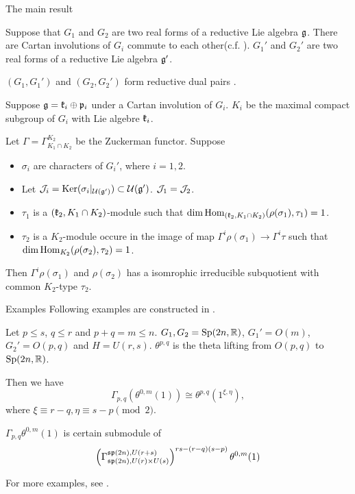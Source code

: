 \documentclass{beamer}
\begin{document}
\begin{frame}{The main result}
\begin{theorem}
  Suppose that 
  $G_1$ and $G_2$ are two real forms of a reductive Lie algebra $\fgg$.
  There are Cartan involutions of $G_i$ commute to each other(c.f. \cite{WallachZhu2004}).
  $G_1'$ and $G_2'$ are two real forms of a reductive Lie algebra $\fgg'$.

  $(G_1,G_1')$ and $(G_2,G_2')$ form reductive dual pairs .
  
  Suppose 
  $\fgg=\fkk_i \oplus \fpp_i$ under a Cartan involution of $G_i$.
  $K_i$ be the maximal compact subgroup of $G_i$ with Lie algebre $\fkk_i$.
 
  Let $\Gamma=\Gamma_{K_1\cap K_2}^{K_2}$ be the Zuckerman functor.
  Suppose 
  \begin{itemize}
    \item $\sigma_i$ are characters of $G_i'$, where $i=1,2$. 
  \item  Let $\cjj_i = \Ker(\sigma_i|_{\cuu(\fgg')}) \subset \cuu(\fgg')$.
    $\cjj_1 = \cjj_2$.
  \item $\tau_1$ is a $(\fkk_2,K_1\cap K_2)$-module such that
    $\dim \Hom_{(\fkk_2,K_1\cap K_2)}(\rho(\sigma_1),\tau_1) = 1$.
  \item $\tau_2$ is a $K_2$-module occure in the
    image of map $\Gamma^i \rho(\sigma_1) \to \Gamma^i \tau$ 
    such that 
    $\dim \Hom_{K_2}(\rho(\sigma_2),\tau_2) =1$.
  \end{itemize}
  Then $\Gamma^i \rho(\sigma_1)$ and 
  $\rho(\sigma_2)$ has a isomrophic irreducible subquotient 
  with common $K_2$-type $\tau_2$.
\end{theorem}
\end{frame}

\begin{frame}{Examples}
Following examples are constructed in \cite{WallachZhu2004}.

Let $p\leq s$, $q\leq r$ and
$p+q=m\leq n$. 
$G_1,G_2 = \Sp(2n,\bR)$, $G_1' = O(m)$, $G_2'=O(p,q)$ and
$H = U(r,s)$.
$\theta^{p,q}$ is the theta lifting from $O(p,q)$ to $\Sp(2n,\bR)$.

Then we have
\[
\Gamma_{p,q}(\theta^{0,m}(1)) \cong \theta^{p,q}(1^{\xi,\eta}),
\]
where $\xi \equiv r-q, \eta\equiv s-p \pmod{2}$.


$\Gamma_{p,q}\theta^{0,m}(1)$ is certain submodule of 
\[
\left(\Gamma_{\sp(2n),U(r)\times U(s)}^{\sp(2n), U(r+s)}\right)^{rs-(r-q)(s-p)}\theta^{0,m}(1)
\]
 

For more examples, see \cite{Enright1985}.
\end{frame}

{}

\end{document}
